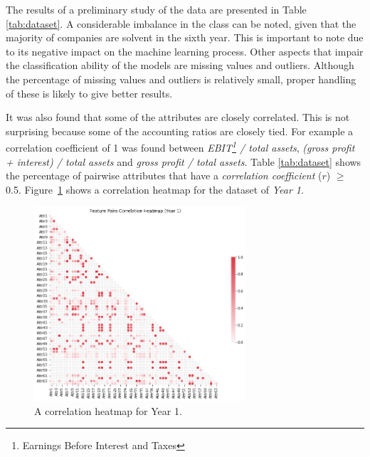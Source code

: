 \documentclass{article}[paper=a4,pagesize=auto,10pt]
\begin{document}
The results of a preliminary study of the data are presented in Table \ref{tab:dataset}. A considerable imbalance in the class can be noted, given that the majority of companies are solvent in the sixth year. This is important to note due to its negative impact on the machine learning process. Other aspects that impair the classification ability of the models are missing values and outliers. Although the percentage of missing values and outliers is relatively small, proper handling of these is likely to give better results. \medskip

It was also found that some of the attributes are closely correlated. This is not surprising because some of the accounting ratios are closely tied. For example a correlation coefficient of 1 was found between \textit{EBIT\footnote{Earnings Before Interest and Taxes} / total assets}, \textit{(gross profit + interest) / total assets} and \textit{gross profit / total assets}. Table \ref{tab:dataset} shows the percentage of pairwise attributes that have a \textit{correlation coefficient} ($r$) $\geq$ 0.5. Figure~\ref{fig:heatmap} shows a correlation heatmap for the dataset of \textit{Year 1}.

\begin{figure}[!ht]
    \centering
    \includegraphics[width=0.7\textwidth]{graphics/heatmap_year1.png}
    \caption{A correlation heatmap for Year 1.}        
    \label{fig:heatmap}
\end{figure}




\end{document}
